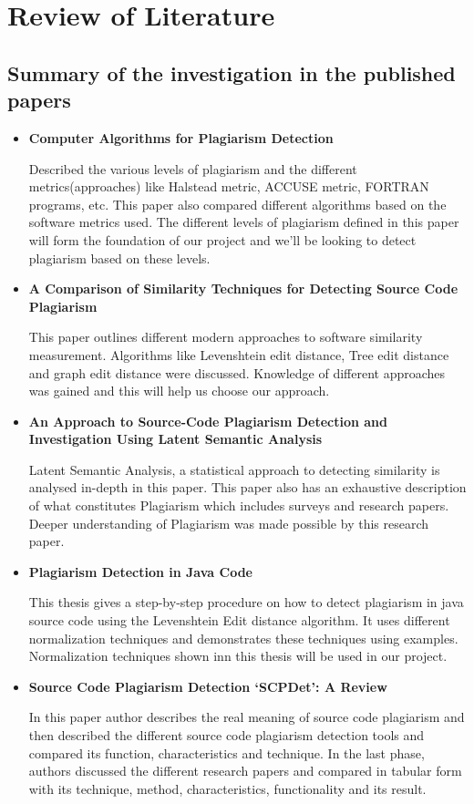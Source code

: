 			\chapter{Review of Literature }
			\section{Summary of the investigation in the published papers}
			
			\begin{itemize}
			\item \textbf{Computer Algorithms for Plagiarism Detection}
			
			Described the various levels of plagiarism and the different metrics(approaches) like Halstead metric, ACCUSE metric, FORTRAN programs, etc. This paper also compared different algorithms based on the software metrics used. The different levels of plagiarism defined in this paper will form the foundation of our project and we’ll be looking to detect plagiarism based on these levels.
			
			
			\item \textbf{A Comparison of Similarity Techniques for Detecting Source Code Plagiarism}
			
			This paper outlines different modern approaches to software similarity measurement. Algorithms like Levenshtein edit distance, Tree edit distance and graph edit distance were discussed. Knowledge of different approaches was gained and this will help us choose our approach.
			
			\item  \textbf{An Approach to Source-Code Plagiarism Detection and Investigation Using Latent Semantic Analysis}
			
			Latent Semantic Analysis, a statistical approach to detecting similarity is analysed in-depth in this paper. This paper also has an exhaustive description of what constitutes Plagiarism which includes surveys and research papers. Deeper understanding of Plagiarism was made possible by this research paper.
			
			\item  \textbf{Plagiarism Detection in Java Code}
			
			This thesis gives a step-by-step procedure on how to detect plagiarism in java source code using the Levenshtein Edit distance algorithm. It uses different normalization techniques and demonstrates these techniques using examples. Normalization techniques shown inn this thesis will be used in our project.
			
			\item \textbf{Source Code Plagiarism Detection ‘SCPDet’: A Review}
			
			In this paper author describes the real meaning of source code plagiarism and  then described the different source code plagiarism detection tools and compared its function, characteristics and technique. In the last phase, authors discussed the different research papers and compared in tabular form with its technique, method, characteristics, functionality and its result.
			
			\end{itemize} 
			

